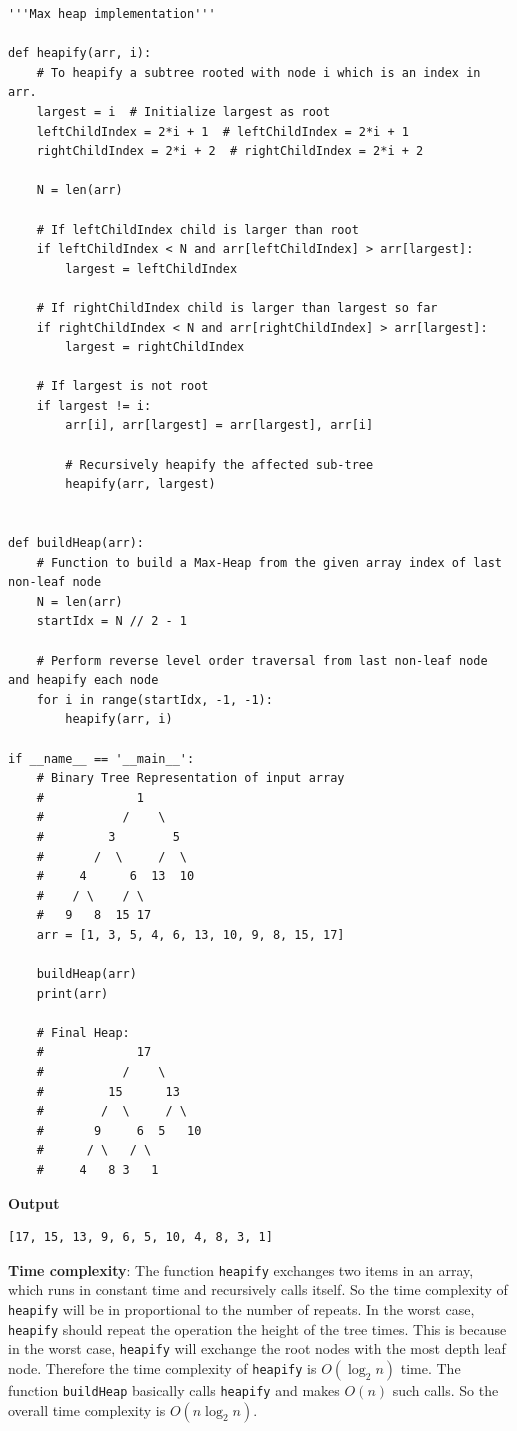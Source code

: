 \documentclass[a4paper,11pt]{book}
\begin{document}
\begin{lstlisting}
'''Max heap implementation'''

def heapify(arr, i):
    # To heapify a subtree rooted with node i which is an index in arr.
    largest = i  # Initialize largest as root
    leftChildIndex = 2*i + 1  # leftChildIndex = 2*i + 1
    rightChildIndex = 2*i + 2  # rightChildIndex = 2*i + 2

    N = len(arr)
 
    # If leftChildIndex child is larger than root
    if leftChildIndex < N and arr[leftChildIndex] > arr[largest]:
        largest = leftChildIndex
 
    # If rightChildIndex child is larger than largest so far
    if rightChildIndex < N and arr[rightChildIndex] > arr[largest]:
        largest = rightChildIndex
 
    # If largest is not root
    if largest != i:
        arr[i], arr[largest] = arr[largest], arr[i]
 
        # Recursively heapify the affected sub-tree
        heapify(arr, largest)
 

def buildHeap(arr):
    # Function to build a Max-Heap from the given array index of last non-leaf node
    N = len(arr)
    startIdx = N // 2 - 1
 
    # Perform reverse level order traversal from last non-leaf node and heapify each node
    for i in range(startIdx, -1, -1):
        heapify(arr, i)
 
if __name__ == '__main__':
    # Binary Tree Representation of input array
    #             1
    #           /    \
    #         3        5
    #       /  \     /  \
    #     4      6  13  10
    #    / \    / \
    #   9   8  15 17
    arr = [1, 3, 5, 4, 6, 13, 10, 9, 8, 15, 17]
 
    buildHeap(arr)
    print(arr)

    # Final Heap:
    #             17
    #           /    \
    #         15      13
    #        /  \     / \
    #       9     6  5   10
    #      / \   / \
    #     4   8 3   1
\end{lstlisting}
\textbf{Output}
\begin{lstlisting}
[17, 15, 13, 9, 6, 5, 10, 4, 8, 3, 1]
\end{lstlisting}

\noindent \textbf{Time complexity}: The function \lstinline{heapify} exchanges two items in an array, which runs in constant time and recursively calls itself. So the time complexity of \lstinline{heapify} will be in proportional to the number of repeats. In the worst case, \lstinline{heapify} should repeat the operation the height of the tree times. This is because in the worst case, \lstinline{heapify} will exchange the root nodes with the most depth leaf node. Therefore the time complexity of \lstinline{heapify} is $O(\log_2 n)$ time. The function \lstinline{buildHeap} basically calls \lstinline{heapify} and makes $O(n)$ such calls. So the overall time complexity is $O(n\log_2 n)$.
\end{document}
